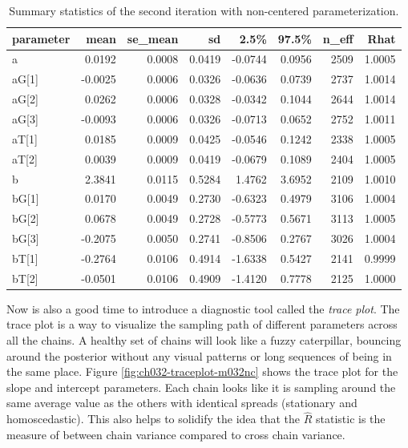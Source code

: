 \documentclass[11pt, oneside, openany]{scrbook}
\begin{document}
\begin{table}[!h]

\caption{\label{tab:ch032-Bleeding-Tuna}Summary statistics of the second iteration with non-centered parameterization.}
\centering
\begin{tabular}[t]{lrrrrrrr}
\toprule
parameter & mean & se\_mean & sd & 2.5\% & 97.5\% & n\_eff & Rhat\\
\midrule
a & 0.0192 & 0.0008 & 0.0419 & -0.0744 & 0.0956 & 2509 & 1.0005\\
aG[1] & -0.0025 & 0.0006 & 0.0326 & -0.0636 & 0.0739 & 2737 & 1.0014\\
aG[2] & 0.0262 & 0.0006 & 0.0328 & -0.0342 & 0.1044 & 2644 & 1.0014\\
aG[3] & -0.0093 & 0.0006 & 0.0326 & -0.0713 & 0.0652 & 2752 & 1.0011\\
aT[1] & 0.0185 & 0.0009 & 0.0425 & -0.0546 & 0.1242 & 2338 & 1.0005\\
\addlinespace
aT[2] & 0.0039 & 0.0009 & 0.0419 & -0.0679 & 0.1089 & 2404 & 1.0005\\
b & 2.3841 & 0.0115 & 0.5284 & 1.4762 & 3.6952 & 2109 & 1.0010\\
bG[1] & 0.0170 & 0.0049 & 0.2730 & -0.6323 & 0.4979 & 3106 & 1.0004\\
bG[2] & 0.0678 & 0.0049 & 0.2728 & -0.5773 & 0.5671 & 3113 & 1.0005\\
bG[3] & -0.2075 & 0.0050 & 0.2741 & -0.8506 & 0.2767 & 3026 & 1.0004\\
\addlinespace
bT[1] & -0.2764 & 0.0106 & 0.4914 & -1.6338 & 0.5427 & 2141 & 0.9999\\
bT[2] & -0.0501 & 0.0106 & 0.4909 & -1.4120 & 0.7778 & 2125 & 1.0000\\
\bottomrule
\end{tabular}
\end{table}

Now is also a good time to introduce a diagnostic tool called the \emph{trace plot}. The trace plot is a way to visualize the sampling path of different parameters across all the chains. A healthy set of chains will look like a fuzzy caterpillar, bouncing around the posterior without any visual patterns or long sequences of being in the same place. Figure \ref{fig:ch032-traceplot-m032nc} shows the trace plot for the slope and intercept parameters. Each chain looks like it is sampling around the same average value as the others with identical spreads (stationary and homoscedastic). This also helps to solidify the idea that the \(\hat{R}\) statistic is the measure of between chain variance compared to cross chain variance.
\end{document}
